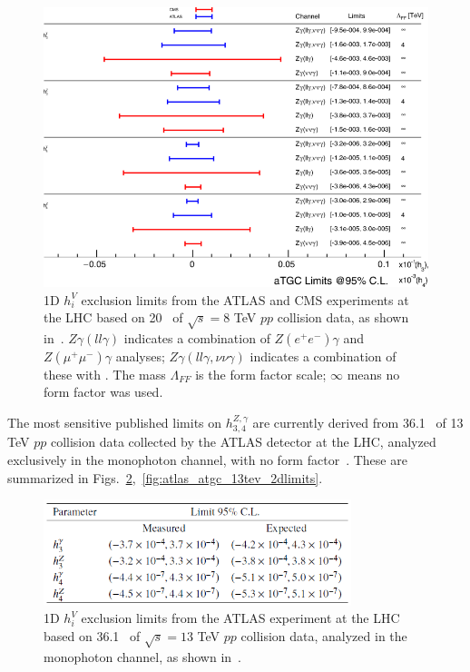 \documentclass[oneside, letterpaper, 12pt, oldfontcommands]{memoir}
\begin{document}
\begin{figure}[hbtp]
  \begin{center}
    \includegraphics[width=\textwidth]{Figures/lhc_8tev_atgc_1dlimits.png}
    \caption{
      1D $h_{i}^{V}$ exclusion limits from the ATLAS and CMS experiments at the LHC based on 20 \fbinv\ of $\sqrt{s} = 8$ TeV
      $pp$ collision data, as shown in~\cite{ref:RevModPhys.89.035008}.
      $Z\gamma(ll\gamma)$ indicates a combination of $Z(e^\mathrm{+}e^\mathrm{-})\gamma$ and $Z(\mu^\mathrm{+}\mu^\mathrm{-})\gamma$
      analyses; $Z\gamma(ll\gamma,\nu\nu\gamma)$ indicates a combination of these with \zinvg. The mass $\Lambda_{FF}$
      is the form factor scale; $\infty$ means no form factor was used.
    }
    \label{fig:lhc_8tev_atgc_1dlimits}
  \end{center}
\end{figure}

The most sensitive published limits on $h_{3,4}^{Z,\gamma}$ are currently derived from 36.1 \fbinv\ of 13 TeV $pp$ collision
data collected by the ATLAS detector at the LHC, analyzed exclusively in the monophoton channel, with no form factor~\cite{ref:CERN-EP-2018-220}.
These are summarized in Figs.~\ref{fig:atlas_atgc_13tev_1dlimits},~\ref{fig:atlas_atgc_13tev_2dlimits}.

\begin{figure}[hbtp]
  \begin{center}
    \includegraphics[width=0.8\textwidth]{Figures/atlas_atgc_13tev_1dlimits.png}
    \caption{
      1D $h_{i}^{V}$ exclusion limits from the ATLAS experiment at the LHC based on 36.1 \fbinv\ of $\sqrt{s} = 13$ TeV
      $pp$ collision data, analyzed in the monophoton channel, as shown in~\cite{ref:CERN-EP-2018-220}.
    }
    \label{fig:atlas_atgc_13tev_1dlimits}
  \end{center}
\end{figure}
\end{document}

